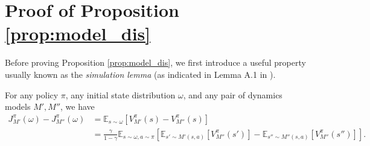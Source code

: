 
\section{Proof of Proposition \ref{prop:model_dis}}
\label{app:proof}


Before proving Proposition \ref{prop:model_dis}, we first introduce a useful property usually known as the \textit{simulation lemma} (\eg as indicated in Lemma A.1 in \citep{vemula2023virtues}).
\begin{lemma}
\label{lemma:sim}
    For any policy $\pi$, any initial state distribution $\omega$, and any pair of dynamics models $M', M''$, we have
    \begin{align}
        J^{\pi}_{M'}(\omega)-J^{\pi}_{M''}(\omega)
        &=\mathbb{E}_{s\sim \omega}[V^{\pi}_{M'}(s)-V^{\pi}_{M''}(s)]\\
        & = \frac{\gamma}{1-\gamma}\mathbb{E}_{s\sim\omega, a\sim\pi}\left [\mathbb{E}_{s'\sim M'(s,a)}[V^{\pi}_{M''}(s')]-\mathbb{E}_{s''\sim M''(s,a)}[V^{\pi}_{M''}(s'')]\right].
    \end{align}
\end{lemma}

